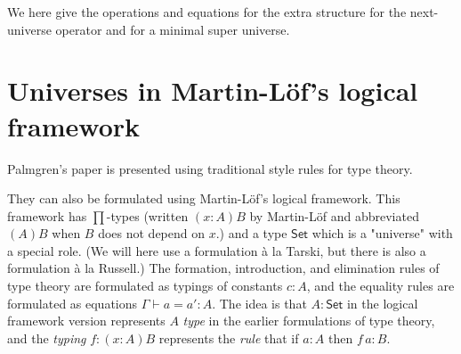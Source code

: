 \documentclass[10pt,a4paper]{article}
\newcommand{\Set}{\mathsf{Set}}
\begin{document}
We here give the operations and equations for the extra structure for the next-universe operator and for a minimal super universe.

\section{Universes in Martin-Löf's logical framework}

Palmgren's paper is presented using traditional style rules for type theory.

They can also be formulated using Martin-Löf's logical framework. This framework has $\prod$-types (written $(x : A)B$ by Martin-Löf and abbreviated $(A)B$ when $B$ does not depend on $x$.) and a type $\Set$ which is a "universe" with a special role. (We will here use a formulation \`a la Tarski, but there is also a formulation \`a la Russell.) The formation, introduction, and elimination rules of type theory are formulated as typings of constants $c : A$, and the equality rules are formulated as equations $\Gamma \vdash a = a' : A$. The idea is that $A : \Set$ in the logical framework version represents $A$ {\em type} in the earlier formulations of type theory, and the {\em typing} $f : (x : A)B$ represents the {\em rule} that if $a : A$ then $f\,a : B$.
\end{document}
